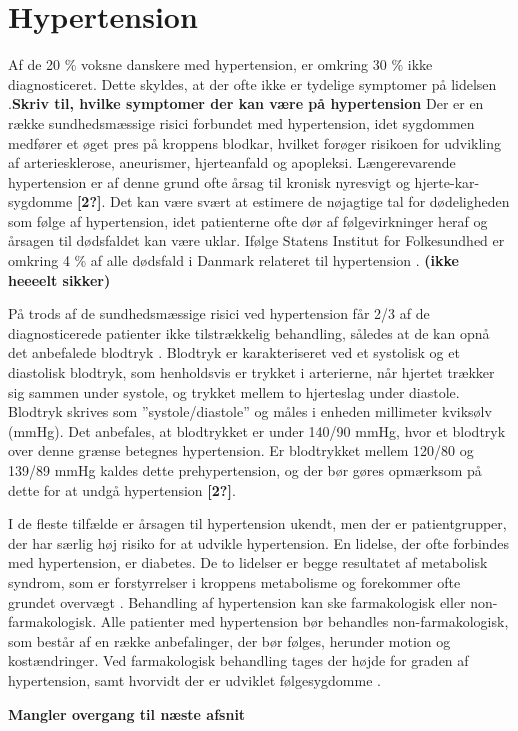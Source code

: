 \section{Hypertension}

Af de 20 \% voksne danskere med hypertension, er omkring 30 \% ikke diagnosticeret. Dette skyldes, at der ofte ikke er tydelige symptomer på lidelsen \cite{kronborg2008}.\textbf{Skriv til, hvilke symptomer der kan være på hypertension}
Der er en række sundhedsmæssige risici forbundet med hypertension, idet sygdommen medfører et øget pres på kroppens blodkar, hvilket forøger risikoen for udvikling af arteriesklerose, aneurismer, hjerteanfald og apopleksi. Længerevarende hypertension er af denne grund ofte årsag til kronisk nyresvigt og hjerte-kar-sygdomme \textbf{[2?]}. Det kan være svært at estimere de nøjagtige tal for dødeligheden som følge af hypertension, idet patienterne ofte dør af følgevirkninger heraf og årsagen til dødsfaldet kan være uklar. Ifølge Statens Institut for Folkesundhed er omkring 4 \% af alle dødsfald i Danmark relateret til hypertension \cite{juel2006}. \textbf{(ikke heeeelt sikker)}
 
På trods af de sundhedsmæssige risici ved hypertension får 2/3 af de diagnosticerede patienter ikke tilstrækkelig behandling, således at de kan opnå det anbefalede blodtryk \cite{paulsen2012}.
Blodtryk er karakteriseret ved et systolisk og et diastolisk blodtryk, som henholdsvis er trykket i arterierne, når hjertet trækker sig sammen under systole, og trykket mellem to hjerteslag under diastole. Blodtryk skrives som ”systole/diastole” og måles i enheden millimeter kviksølv (mmHg). Det anbefales, at blodtrykket er under 140/90 mmHg, hvor et blodtryk over denne grænse betegnes hypertension. Er blodtrykket mellem 120/80 og 139/89 mmHg kaldes dette prehypertension, og der bør gøres opmærksom på dette for at undgå hypertension \textbf{[2?]}.

I de fleste tilfælde er årsagen til hypertension ukendt, men der er patientgrupper, der har særlig høj risiko for at udvikle hypertension. En lidelse, der ofte forbindes med hypertension, er diabetes. De to lidelser er begge resultatet af metabolisk syndrom, som er forstyrrelser i kroppens metabolisme og forekommer ofte grundet overvægt \cite{cheung2012}.
Behandling af hypertension kan ske farmakologisk eller non-farmakologisk. Alle patienter med hypertension bør behandles non-farmakologisk, som består af en række anbefalinger, der bør følges, herunder motion og kostændringer. Ved farmakologisk behandling tages der højde for graden af hypertension, samt hvorvidt der er udviklet følgesygdomme \cite{lodberg2016}.

\textbf{Mangler overgang til næste afsnit}
